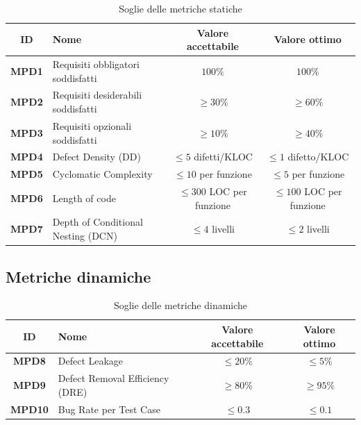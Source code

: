 \documentclass[a4paper,12pt]{article}
\begin{document}
\begin{table}[H]
\centering
\renewcommand{\arraystretch}{1.5}
\begin{tabularx}{\textwidth}{|c|Y|c|c|}
\hline
{} \textbf{ID} & \textbf{Nome} & \textbf{Valore accettabile} & \textbf{Valore ottimo} \\ \hline
\textbf{MPD1} & Requisiti obbligatori soddisfatti & $100\%$ & $100\%$ \\ \hline
\textbf{MPD2} & Requisiti desiderabili soddisfatti & $\ge 30\%$ & $\ge 60\%$ \\ \hline
\textbf{MPD3} & Requisiti opzionali soddisfatti & $\ge 10\%$ & $\ge 40\%$ \\ \hline
\textbf{MPD4} & Defect Density (DD) & $\le 5$ difetti/KLOC & $\le 1$ difetto/KLOC \\ \hline
\textbf{MPD5} & Cyclomatic Complexity & $\le 10$ per funzione & $\le 5$ per funzione \\ \hline
\textbf{MPD6} & Length of code & $\le 300$ LOC per funzione & $\le 100$ LOC per funzione \\ \hline
\textbf{MPD7} & Depth of Conditional Nesting (DCN) & $\le 4$ livelli & $\le 2$ livelli \\ \hline
\end{tabularx}
\caption{Soglie delle metriche statiche}
\end{table}

\subsection{Metriche dinamiche}\label{subsec:metriche-dinamiche}
\begin{table}[H]
\centering
\renewcommand{\arraystretch}{1.5}
\begin{tabularx}{\textwidth}{|c|Y|c|c|}
\hline
{} \textbf{ID} & \textbf{Nome} & \textbf{Valore accettabile} & \textbf{Valore ottimo} \\ \hline
\textbf{MPD8} & Defect Leakage & $\le 20\%$ & $\le 5\%$ \\ \hline
\textbf{MPD9} & Defect Removal Efficiency (DRE) & $\ge 80\%$ & $\ge 95\%$ \\ \hline
\textbf{MPD10} & Bug Rate per Test Case & $\le 0.3$ & $\le 0.1$ \\ \hline
\end{tabularx}
\caption{Soglie delle metriche dinamiche}
\end{table}

\end{document}
